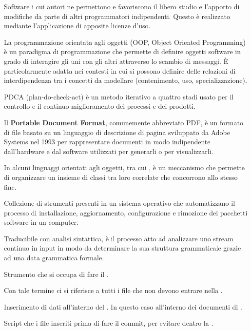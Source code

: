 Software i cui autori ne permettono e favoriscono il libero studio e l'apporto di modifiche da parte di altri programmatori indipendenti. Questo è realizzato mediante l'applicazione di apposite licenze d'uso.

La programmazione orientata agli oggetti (OOP, Object Oriented Programming) è un paradigma di programmazione che permette di definire oggetti software in grado di interagire gli uni con gli altri attraverso lo scambio di messaggi. È particolarmente adatta nei contesti in cui si possono definire delle relazioni di interdipendenza tra i concetti da modellare (contenimento, uso, specializzazione).


PDCA (plan-do-check-act) è un metodo iterativo a quattro stadi usato per il controllo e il continuo miglioramento dei processi e dei prodotti.

Il \textbf{Portable Document Format}, comunemente abbreviato PDF, è un formato di file basato su un linguaggio di descrizione di pagina sviluppato da Adobe Systems nel 1993 per rappresentare documenti in modo indipendente dall'hardware e dal software utilizzati per generarli o per visualizzarli. 

In alcuni linguaggi orientati agli oggetti, tra cui , è un meccanismo che permette di organizzare un insieme di classi tra loro correlate che concorrono allo stesso fine.

Collezione di strumenti presenti in un sistema operativo che automatizzano il processo di installazione, aggiornamento, configurazione e rimozione dei pacchetti software in un computer.

Traducibile con analisi sintattica, è il processo atto ad analizzare uno stream continuo in input in modo da determinare la sua struttura grammaticale grazie ad una data grammatica formale.

Strumento che si occupa di fare il .

Con tale termine ci si riferisce a tutti i file che non devono entrare nella .

Inserimento di dati all'interno del . In questo caso all'interno dei documenti di .

Script che  i file inseriti prima di fare il commit, per evitare  dentro la .

